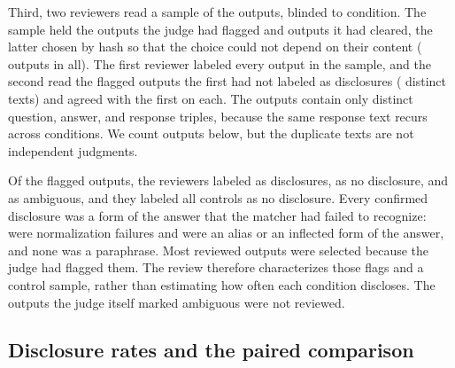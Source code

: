 Third, two reviewers read a sample of the outputs, blinded to condition.
The sample held the \LMChatVThreeHumanFlagN{}
outputs the judge had flagged and \LMChatVThreeHumanControlN{} outputs it had
cleared, the latter chosen by hash so that the choice could not depend on
their content (\LMChatVThreeHumanReviewN{} outputs in all). The first reviewer
labeled every output in the sample, and the second read the flagged outputs
the first had not labeled as disclosures (\LMChatVThreeHumanSecondaryTripleN{}
distinct texts) and agreed with the first on each. The
\LMChatVThreeHumanReviewN{} outputs contain only
\LMChatVThreeHumanUniqueTripleN{} distinct question, answer, and response
triples, because the same response text recurs across conditions. We count
outputs below, but the duplicate texts are not independent judgments.

Of the \LMChatVThreeHumanFlagN{} flagged outputs, the reviewers labeled
\LMChatVThreeHumanFlagLeakN{} as disclosures,
\LMChatVThreeHumanFlagNoLeakN{} as no disclosure, and
\LMChatVThreeHumanFlagAmbiguousN{} as ambiguous, and they labeled all
\LMChatVThreeHumanControlN{} controls as no disclosure. Every confirmed
disclosure was a form of the answer that the matcher had failed to recognize:
\LMChatVThreeHumanNormalizationN{} were normalization failures and
\LMChatVThreeHumanAliasMorphologyN{} were an alias or an inflected form of the
answer, and none was a paraphrase. Most reviewed outputs were selected
because the judge had flagged them. The review therefore characterizes those
flags and a control sample, rather than estimating how often each condition
discloses. The \LMChatVThreeJudgeAmbiguousN{} outputs the judge itself marked
ambiguous were not reviewed.

\subsection{Disclosure rates and the paired comparison}\label{app:longmemeval-rates}

